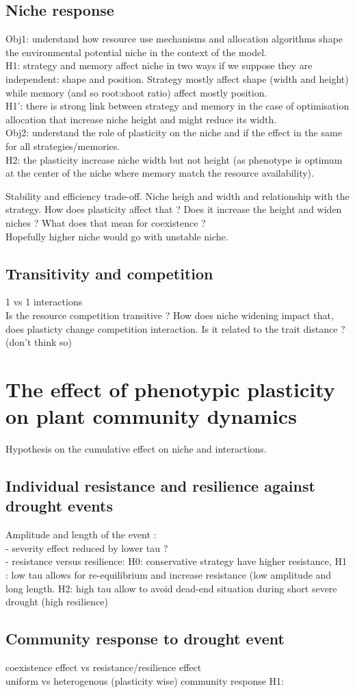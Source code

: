 \documentclass[english,10pt]{article}
\begin{document}
\subsection{Niche response}
Obj1: understand how resource use mechanisms and allocation algorithms shape the environmental potential niche in the context of the model.\\
H1: strategy and memory affect niche in two ways if we suppose they are independent: shape and position. Strategy mostly affect shape (width and height) while memory (and so root:shoot ratio) affect mostly position.\\
H1': there is strong link between strategy and memory in the case of optimisation allocation that increase niche height and might reduce its width.\\
Obj2: understand the role of plasticity on the niche and if the effect in the same for all strategies/memories.\\
H2: the plasticity increase niche width but not height (as phenotype is optimum at the center of the niche where memory match the resource availability).

Stability and efficiency trade-off. Niche heigh and width and relationship with the strategy. How does plasticity affect that ? Does it increase the height and widen niches ? What does that mean for coexistence ?\\
Hopefully higher niche would go with unstable niche.

\subsection{Transitivity and competition}
1 vs 1 interactions\\
Is the resource competition transitive ? How does niche widening impact that, does plasticty change competition interaction. Is it related to the trait distance ? (don't think so)

\section{The effect of phenotypic plasticity on plant community dynamics}
Hypothesis on the cumulative effect on niche and interactions.

\subsection{Individual resistance and resilience against drought events}
Amplitude and length of the event :\\
- severity effect reduced by lower tau ?\\
- resistance versus resilience: H0: conservative strategy have higher resistance, H1 : low tau allows for re-equilibrium and increase resistance (low amplitude and long length. H2: high tau allow to avoid dead-end situation during short severe drought (high resilience)
\subsection{Community response to drought event}
coexistence effect vs resistance/resilience effect\\
uniform vs heterogenous (plasticity wise) community response
H1: 


 \nocite{TitlesOn}
 
 


  
\end{document}
